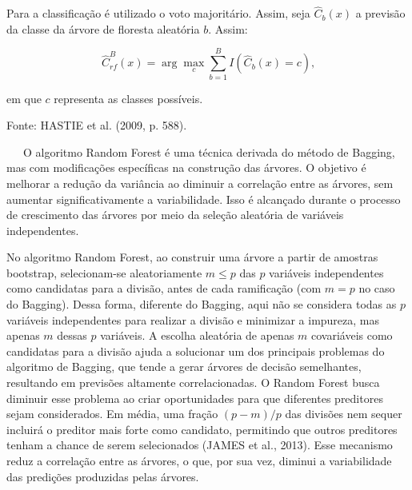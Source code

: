 \documentclass[
  12pt,
  a4paper,
]{scrreprt}
\begin{document}
\begin{algo}
{\begin{algorithm}[H]
\begin{algorithmic}
\vspace{1em}

\State \hspace{0.7em} Para a classificação é utilizado o voto majoritário. Assim, seja $\hat{C}_{b}\left(x\right)$ a previsão da classe da árvore de floresta aleatória $b$. Assim:

$$
\hat{C}^{B}_{rf}\left(x\right) = \arg \max_c \sum^{B}_{b = 1}I\left(\hat{C}_b\left(x\right) = c\right)\text{,}
$$

\State em que $c$ representa as classes possíveis.

\end{algorithmic}
\end{algorithm}

}

\caption{\label{algo-rf}Fonte: HASTIE et al. (2009, p. 588).}

\end{algo}%

~~~O algoritmo Random Forest é uma técnica derivada do método de
Bagging, mas com modificações específicas na construção das árvores. O
objetivo é melhorar a redução da variância ao diminuir a correlação
entre as árvores, sem aumentar significativamente a variabilidade. Isso
é alcançado durante o processo de crescimento das árvores por meio da
seleção aleatória de variáveis independentes.

\vspace{12pt}

No algoritmo Random Forest, ao construir uma árvore a partir de amostras
bootstrap, selecionam-se aleatoriamente \(m \leq p\) das \(p\) variáveis
independentes como candidatas para a divisão, antes de cada ramificação
(com \(m = p\) no caso do Bagging). Dessa forma, diferente do Bagging,
aqui não se considera todas as \(p\) variáveis independentes para
realizar a divisão e minimizar a impureza, mas apenas \(m\) dessas \(p\)
variáveis. A escolha aleatória de apenas \(m\) covariáveis como
candidatas para a divisão ajuda a solucionar um dos principais problemas
do algoritmo de Bagging, que tende a gerar árvores de decisão
semelhantes, resultando em previsões altamente correlacionadas. O Random
Forest busca diminuir esse problema ao criar oportunidades para que
diferentes preditores sejam considerados. Em média, uma fração
\((p -m)/ p\) das divisões nem sequer incluirá o preditor mais forte
como candidato, permitindo que outros preditores tenham a chance de
serem selecionados (JAMES et al., 2013). Esse mecanismo reduz a
correlação entre as árvores, o que, por sua vez, diminui a variabilidade
das predições produzidas pelas árvores.
\end{document}
